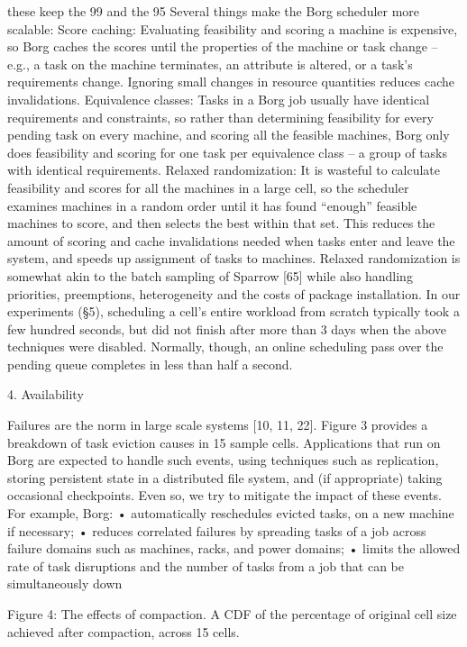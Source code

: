 these keep the 99%
and the 95%
Several things make the Borg scheduler more scalable:
Score caching: Evaluating feasibility and scoring a machine is expensive, so Borg caches the scores until the properties of the machine or task change – e.g., a task on the machine terminates, an attribute is altered, or a task’s requirements change. Ignoring small changes in resource quantities
reduces cache invalidations.
Equivalence classes: Tasks in a Borg job usually have
identical requirements and constraints, so rather than determining feasibility for every pending task on every machine,
and scoring all the feasible machines, Borg only does feasibility and scoring for one task per equivalence class – a
group of tasks with identical requirements.
Relaxed randomization: It is wasteful to calculate feasibility and scores for all the machines in a large cell, so the
scheduler examines machines in a random order until it has
found “enough” feasible machines to score, and then selects
the best within that set. This reduces the amount of scoring
and cache invalidations needed when tasks enter and leave
the system, and speeds up assignment of tasks to machines.
Relaxed randomization is somewhat akin to the batch sampling of Sparrow [65] while also handling priorities, preemptions, heterogeneity and the costs of package installation.
In our experiments (§5), scheduling a cell’s entire workload from scratch typically took a few hundred seconds, but
did not finish after more than 3 days when the above techniques were disabled. Normally, though, an online scheduling pass over the pending queue completes in less than half
a second.

4. Availability

Failures are the norm in large scale systems [10, 11, 22].
Figure 3 provides a breakdown of task eviction causes in
15 sample cells. Applications that run on Borg are expected
to handle such events, using techniques such as replication,
storing persistent state in a distributed file system, and (if
appropriate) taking occasional checkpoints. Even so, we try
to mitigate the impact of these events. For example, Borg:
• automatically reschedules evicted tasks, on a new machine if necessary;
• reduces correlated failures by spreading tasks of a job
across failure domains such as machines, racks, and
power domains;
• limits the allowed rate of task disruptions and the number
of tasks from a job that can be simultaneously down

Figure 4: The effects of compaction. A CDF of the percentage of
original cell size achieved after compaction, across 15 cells.

